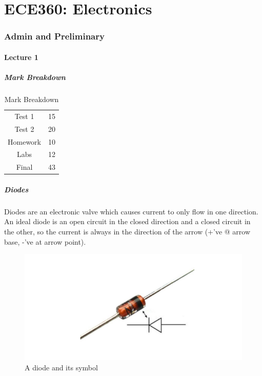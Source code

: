 \documentclass[../notes.tex]{subfiles}
\begin{document}
\part{ECE360: Electronics}


\section{Admin and Preliminary}

\subsection{Lecture 1}



\subsubsection{Mark Breakdown}

\begin{table}[H]
	\centering
	\caption{Mark Breakdown}
	\begin{tabular}{|c|c|}
		\hline
		Test 1 & 15 \\
		Test 2 & 20 \\
		Homework & 10 \\
		Labs & 12 \\
		Final & 43 \\
		\hline
	\end{tabular}
\end{table}

\subsubsection{Diodes}

Diodes are an electronic valve which causes current to only flow in one direction.
An ideal diode is an open circuit in the closed direction and a closed circuit in the other, so the current is always in the direction of the arrow (+'ve @ arrow base, -'ve at arrow point).


\begin{figure}[H]
	\centering
	\includegraphics[width=0.8\linewidth]{img/360_diode.png}
	\caption{A diode and its symbol}
	\label{fig:360:diode}
\end{figure}
\end{document}
